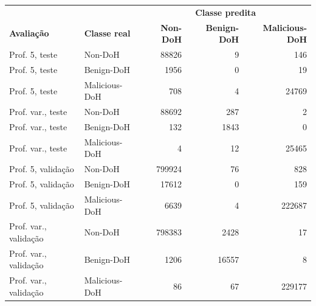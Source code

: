 \begin{tabular}{llrrr}
\hline
\multicolumn{2}{c}{\textbf{}} & \multicolumn{3}{c}{\textbf{Classe predita}} \\
\textbf{Avaliação} & \textbf{Classe real} & \textbf{Non-DoH} & \textbf{Benign-DoH} & \textbf{Malicious-DoH} \\ \hline
Prof. 5, teste & Non-DoH & 88826 & 9 & 146 \\
Prof. 5, teste & Benign-DoH & 1956 & 0 & 19 \\
Prof. 5, teste & Malicious-DoH & 708 & 4 & 24769 \\
\hline
Prof. var., teste & Non-DoH & 88692 & 287 & 2 \\
Prof. var., teste & Benign-DoH & 132 & 1843 & 0 \\
Prof. var., teste & Malicious-DoH & 4 & 12 & 25465 \\
\hline
Prof. 5, validação & Non-DoH & 799924 & 76 & 828 \\
Prof. 5, validação & Benign-DoH & 17612 & 0 & 159 \\
Prof. 5, validação & Malicious-DoH & 6639 & 4 & 222687 \\
\hline
Prof. var., validação & Non-DoH & 798383 & 2428 & 17 \\
Prof. var., validação & Benign-DoH & 1206 & 16557 & 8 \\
Prof. var., validação & Malicious-DoH & 86 & 67 & 229177 \\
\hline
\end{tabular}

